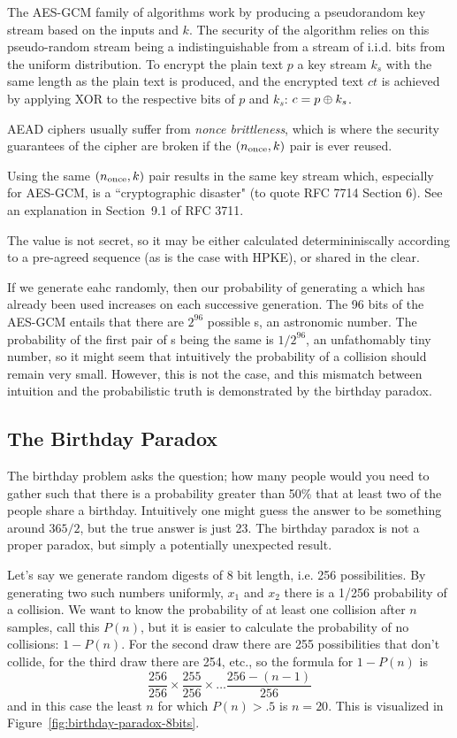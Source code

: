 The \ac{AES}-\ac{GCM} family of algorithms work by producing a pseudorandom key stream based on the inputs \nonce and $k$. The security of the algorithm relies on this pseudo-random stream being a indistinguishable from a stream of i.i.d. bits from the uniform distribution. To encrypt the plain text $p$ a key stream $k_s$ with the same length as the plain text is produced, and the encrypted text $ct$ is achieved by applying \ac{XOR} to the respective bits of $p$ and $k_s$: $c=p\oplus k_s$.

\ac{AEAD} ciphers usually suffer from {\em nonce brittleness},
which is where the security guarantees of the cipher are broken if the $(\nonce,k)$ pair is ever reused.

Using the same $(\nonce, k)$ pair results in the same key stream which, especially for AES-GCM, is a ``cryptographic disaster" (to quote RFC 7714 Section 6). See an explanation in Section~9.1 of RFC 3711.

The \nonce value is not secret, so it may be either calculated determininiscally according to a pre-agreed sequence (as is the case with \ac{HPKE}), or shared in the clear.

If we generate eahc \nonce randomly, then our probability of generating a \nonce which has already been used increases on each successive generation. The 96 bits of the AES-GCM \nonce entails that there are $2^{96}$ possible \nonce s, an astronomic number. The probability of the first pair of \nonce s being the same is $1/2^{96}$, an unfathomably tiny number, so it might seem that intuitively the probability of a \nonce collision should remain very small.
However, this is not the case, and this mismatch between intuition and the probabilistic truth is demonstrated by the birthday paradox.

\subsection{The Birthday Paradox}
The birthday problem asks the question; how many people would you need to gather such that there is a probability greater than 50\% that at least two of the people share a birthday. Intuitively one might guess the answer to be something around $365/2$, but the true answer is just 23. The birthday paradox is not a proper paradox, but simply a potentially unexpected result.

Let's say we generate random digests of 8 bit length, i.e. 256 possibilities. By generating two such numbers uniformly, $x_1$ and $x_2$ there is a 1/256 probability of a collision. We want to know the probability of at least one collision after $n$ samples, call this $P(n)$, but it is easier to calculate the probability of no collisions: $1-P(n)$.
For the second draw there are 255 possibilities that don't collide, for the third draw there are 254, etc., so the formula for $1-P(n)$ is \[\dfrac{256}{256}\times \dfrac{255}{256} \times \ldots \dfrac{256-(n-1)}{256}\] and in this case the least $n$ for which $P(n)>.5$ is $n=20$. This is visualized in Figure~\ref{fig:birthday-paradox-8bits}.

